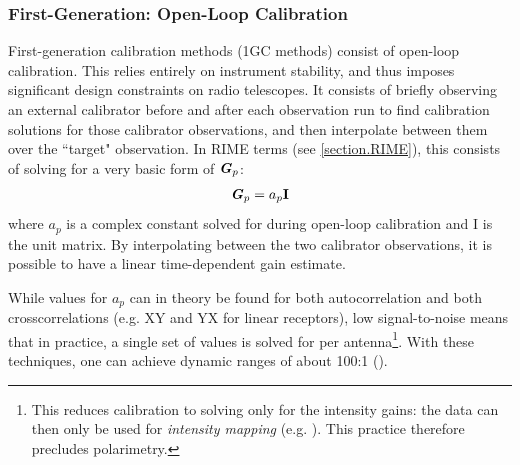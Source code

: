 \subsubsection{First-Generation: Open-Loop Calibration}\label{section.calibration.1gc}

\pg
First-generation calibration methods (1GC methods) consist of open-loop calibration. This relies entirely on instrument stability, and thus imposes significant design constraints on radio telescopes. It consists of briefly observing an external calibrator before and after each observation run to find calibration solutions for those calibrator observations, and then interpolate between them over the ``target" observation. %
In RIME terms (see \cref{section.RIME}), this consists of solving for a very basic form of $\textbf{\emph{G}}_p$:
\begin{equation}
\Gjones_p = a_p \bm{\mathrm{I}} %
\end{equation}
where $a_p$ is a complex constant solved for during open-loop calibration and $\mathrm{I}$ is the unit matrix. By interpolating between the two calibrator observations, it is possible to have a linear time-dependent gain estimate.%

\pg
While values for $a_p$ can in theory be found for both autocorrelation and both crosscorrelations (e.g. XY and YX for linear receptors), low signal-to-noise means that in practice, a single set of values is solved for per antenna\footnote{This reduces calibration to solving only for the intensity gains: the data can then only be used for \emph{intensity mapping} (e.g. ). This practice therefore precludes polarimetry.}. With these techniques, one can achieve dynamic ranges of about 100:1 ().

